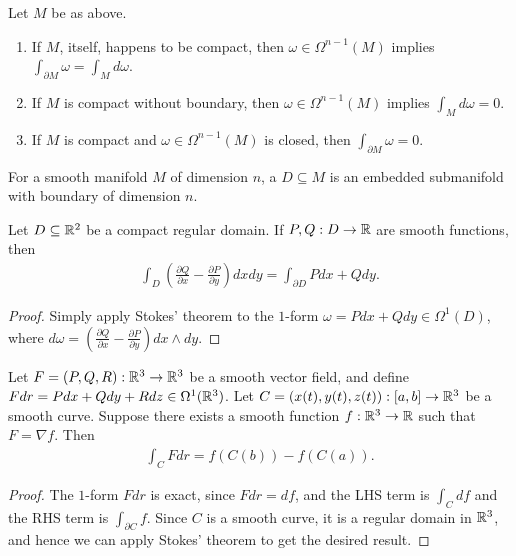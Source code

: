 \begin{corollary}
    Let $M$ be as above.
    \begin{enumerate}
        \item If $M$, itself, happens to be compact, then $\omega \in \Omega^{n-1}(M)$ implies $\int_{\partial M} \omega = \int_{M} d\omega$.
        \item If $M$ is compact without boundary, then $\omega \in \Omega^{n-1}(M)$ implies $\int_{M} d\omega = 0$.
        \item If $M$ is compact and $\omega \in \Omega^{n-1}(M)$ is closed, then $\int_{\partial M} \omega = 0$.
    \end{enumerate}
\end{corollary}

For a smooth manifold $M$ of dimension $n$, a  $D \subseteq M$ is an embedded submanifold with boundary of dimension $n$.

\begin{corollary}
    Let $D \subseteq \mathbb{R}^{2}$ be a compact regular domain. If $P,Q:D \to \mathbb{R}$ are smooth functions, then
    \begin{align}
        \int_{D} \left( \frac{\partial Q}{\partial x} - \frac{\partial P}{\partial y} \right) dx dy = \int_{\partial D} P dx + Q dy.
    \end{align}
\end{corollary}
\begin{proof}
    Simply apply Stokes' theorem to the $1$-form $\omega = P dx + Q dy \in \Omega^{1}(D)$, where $d\omega = \left( \frac{\partial Q}{\partial x} - \frac{\partial P}{\partial y} \right) dx \wedge dy$.
\end{proof}

\begin{corollary}
    Let $F=(P,Q,R):\mathbb{R}^{3} \to \mathbb{R}^{3}$ be a smooth vector field, and define $F dr = P dx + Q dy + R dz \in \Omega^{1}(\mathbb{R}^{3})$. Let $C=(x(t),y(t),z(t)):[a,b] \to \mathbb{R}^{3}$ be a smooth curve. Suppose there exists a smooth function $f:\mathbb{R}^{3} \to \mathbb{R}$ such that $F = \nabla f$. Then
    \begin{align}
        \int_{C} F dr = f(C(b)) - f(C(a)).
    \end{align}
\end{corollary}
\begin{proof}
    The $1$-form $F dr$ is exact, since $F dr = df$, and the LHS term is $\int_{C} df$ and the RHS term is $\int_{\partial C} f$. Since $C$ is a smooth curve, it is a regular domain in $\mathbb{R}^{3}$, and hence we can apply Stokes' theorem to get the desired result.
\end{proof}

